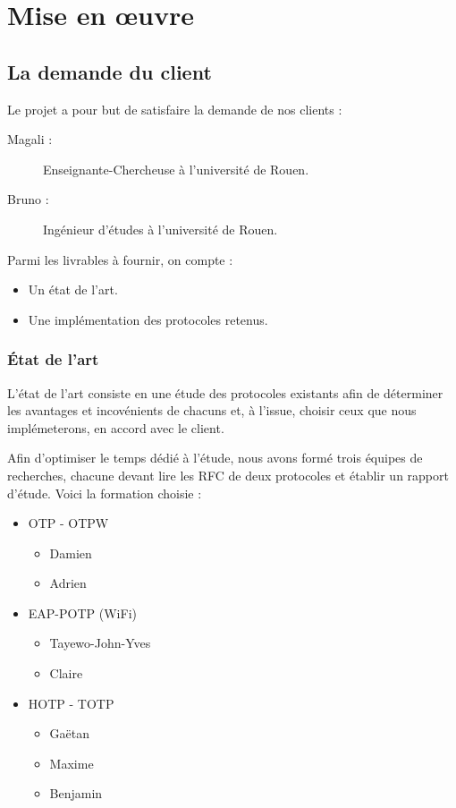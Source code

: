 \chapter{Mise en œuvre}
\section{La demande du client}

  Le projet a pour but de satisfaire la demande de nos clients :

  \begin{description}
    \item[Magali :] Enseignante-Chercheuse à l'université de Rouen.
    \item[Bruno :] Ingénieur d'études à l'université de Rouen.\\
  \end{description}

  Parmi les livrables à fournir, on compte :

  \begin{itemize}
    \item Un état de l'art.
    \item Une implémentation des protocoles retenus.
  \end{itemize}

  \subsection{État de l'art}

    L'état de l'art consiste en une étude des protocoles existants afin de
    déterminer les avantages et incovénients de chacuns et, à l'issue, choisir
    ceux que nous implémeterons, en accord avec le client.

    Afin d'optimiser le temps dédié à l'étude, nous avons formé trois équipes
    de recherches, chacune devant lire les RFC de deux protocoles et établir
    un rapport d'étude. Voici la formation choisie :

    \begin{itemize}
        \item OTP - OTPW
      \begin{itemize}
        \item Damien 
        \item Adrien 
      \end{itemize}
      \item EAP-POTP (WiFi)
      \begin{itemize}
        \item Tayewo-John-Yves 
        \item Claire 
      \end{itemize}
      \item HOTP - TOTP
      \begin{itemize}
        \item Gaëtan 
        \item Maxime 
        \item Benjamin 
      \end{itemize}
    \end{itemize}

